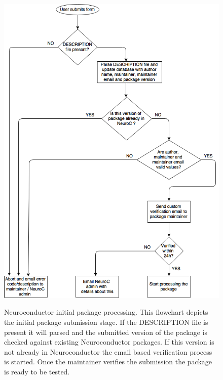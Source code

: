 \documentclass[]{elsarticle} %
\begin{document}
\begin{figure}[!ht]
  \begin{center}
    \caption{Neuroconductor initial package processing. This flowchart depicts the initial package submission stage. If the DESCRIPTION file is present it will parsed and the submitted version of the package is checked against existing Neuroconductor packages. If this version is not already in Neuroconductor the email based verification process is started. Once the maintainer verifies the submission the package is ready to be tested.}
    \label{fig:stage1}
    \includegraphics[height=0.9\textheight]{flow_stage1_draft.png}\label{fig:package_lifetime_1}
%
  \end{center}
\end{figure}
\end{document}
